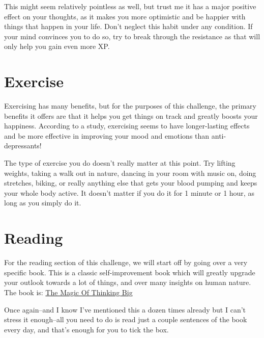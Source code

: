 \documentclass[
]{book}
\begin{document}
This might seem relatively pointless as well, but trust me it has a major positive effect on your thoughts, as it makes you more optimistic and be happier with things that happen in your life. Don't neglect this habit under any condition. If your mind convinces you to do so, try to break through the resistance as that will only help you gain even more XP.

\hypertarget{exercise}{%
\section{Exercise}\label{exercise}}

Exercising has many benefits, but for the purposes of this challenge, the primary benefits it offers are that it helps you get things on track and greatly boosts your happiness. According to a study, exercising seems to have longer-lasting effects and be more effective in improving your mood and emotions than anti-depressants!

The type of exercise you do doesn't really matter at this point. Try lifting weights, taking a walk out in nature, dancing in your room with music on, doing stretches, biking, or really anything else that gets your blood pumping and keeps your whole body active. It doesn't matter if you do it for 1 minute or 1 hour, as long as you simply do it.

\hypertarget{reading}{%
\section{Reading}\label{reading}}

For the reading section of this challenge, we will start off by going over a very specific book. This is a classic self-improvement book which will greatly upgrade your outlook towards a lot of things, and over many insights on human nature. The book is: \href{https://www.google.com/url?sa=t\&rct=j\&q=\&esrc=s\&source=web\&cd=\&ved=2ahUKEwjj9uXHgJqAAxXPM0QIHYboCTEQFnoECBEQAQ\&url=https\%3A\%2F\%2Fwww.researchgate.net\%2Fprofile\%2FRzger-Abdula\%2Fpost\%2FWhat_leadership_books_can_you_recommend_for_me\%2Fattachment\%2F5bae7b2fcfe4a76455f6c7c2\%2FAS\%253A675912282550277\%25401538161454808\%2Fdownload\%2FThe\%2BMagic\%2Bof\%2BThinking\%2BBig.pdf\&usg=AOvVaw0qdaTKW3aTys7FGpy8x7F3\&opi=89978449}{The Magic Of Thinking Big}

Once again--and I know I've mentioned this a dozen times already but I can't stress it enough--all you need to do is read just a couple sentences of the book every day, and that's enough for you to tick the box.
\end{document}
